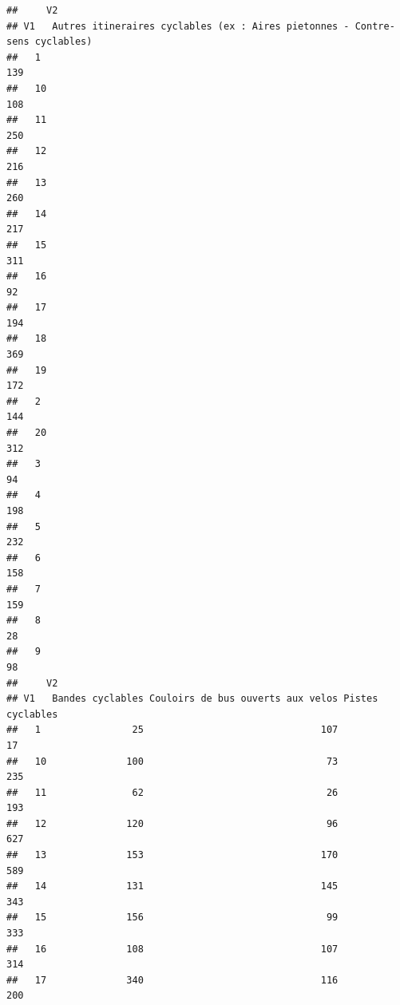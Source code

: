 \documentclass[french,]{compterendu}
\theoremstyle{urcastyle}
\theoremstyle{remark}
\begin{document}
\begin{verbatim}
##     V2
## V1   Autres itineraires cyclables (ex : Aires pietonnes - Contre-sens cyclables)
##   1                                                                          139
##   10                                                                         108
##   11                                                                         250
##   12                                                                         216
##   13                                                                         260
##   14                                                                         217
##   15                                                                         311
##   16                                                                          92
##   17                                                                         194
##   18                                                                         369
##   19                                                                         172
##   2                                                                          144
##   20                                                                         312
##   3                                                                           94
##   4                                                                          198
##   5                                                                          232
##   6                                                                          158
##   7                                                                          159
##   8                                                                           28
##   9                                                                           98
##     V2
## V1   Bandes cyclables Couloirs de bus ouverts aux velos Pistes cyclables
##   1                25                               107               17
##   10              100                                73              235
##   11               62                                26              193
##   12              120                                96              627
##   13              153                               170              589
##   14              131                               145              343
##   15              156                                99              333
##   16              108                               107              314
##   17              340                               116              200

\end{verbatim}
\end{document}
